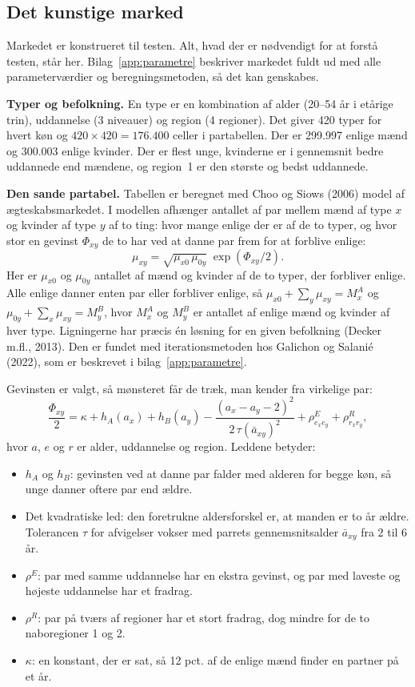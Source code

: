 \documentclass[11pt,a4paper]{article}
\begin{document}
\subsection{Det kunstige marked}

Markedet er konstrueret til testen. Alt, hvad der er nødvendigt for at forstå testen, står her.
Bilag~\ref{app:parametre} beskriver markedet fuldt ud med alle parameterværdier og
beregningsmetoden, så det kan genskabes.

\textbf{Typer og befolkning.} En type er en kombination af alder (20--54 år i etårige trin),
uddannelse (3 niveauer) og region (4 regioner). Det giver 420 typer for hvert køn og
$420\times420=176.400$ celler i partabellen. Der er 299.997 enlige mænd og 300.003 enlige kvinder.
Der er flest unge, kvinderne er i gennemsnit bedre uddannede end mændene, og region~1 er den største
og bedst uddannede.

\textbf{Den sande partabel.} Tabellen er beregnet med Choo og Siows (2006) model af
ægteskabsmarkedet. I modellen afhænger antallet af par mellem mænd af type $x$ og kvinder af type $y$
af to ting: hvor mange enlige der er af de to typer, og hvor stor en gevinst $\Phi_{xy}$ de to har
ved at danne par frem for at forblive enlige:
\[
\mu_{xy}=\sqrt{\mu_{x0}\,\mu_{0y}}\;\exp(\Phi_{xy}/2) .
\]
Her er $\mu_{x0}$ og $\mu_{0y}$ antallet af mænd og kvinder af de to typer, der forbliver enlige.
Alle enlige danner enten par eller forbliver enlige, så
$\mu_{x0}+\sum_y\mu_{xy}=M^A_x$ og $\mu_{0y}+\sum_x\mu_{xy}=M^B_y$, hvor $M^A_x$ og $M^B_y$ er antallet
af enlige mænd og kvinder af hver type. Ligningerne har præcis én løsning for en given befolkning
(Decker m.fl., 2013). Den er fundet med iterationsmetoden hos Galichon og Salanié (2022), som er
beskrevet i bilag~\ref{app:parametre}.

Gevinsten er valgt, så mønsteret får de træk, man kender fra virkelige par:
\[
\frac{\Phi_{xy}}{2}=\kappa+h_A(a_x)+h_B(a_y)-\frac{(a_x-a_y-2)^2}{2\,\tau(\bar a_{xy})^2}
+\rho^E_{e_xe_y}+\rho^R_{r_xr_y},
\]
hvor $a$, $e$ og $r$ er alder, uddannelse og region. Leddene betyder:

\begin{itemize}
\item $h_A$ og $h_B$: gevinsten ved at danne par falder med alderen for begge køn, så unge danner
oftere par end ældre.
\item Det kvadratiske led: den foretrukne aldersforskel er, at manden er to år ældre. Tolerancen
$\tau$ for afvigelser vokser med parrets gennemsnitsalder $\bar a_{xy}$ fra 2 til 6 år.
\item $\rho^E$: par med samme uddannelse har en ekstra gevinst, og par med laveste og højeste
uddannelse har et fradrag.
\item $\rho^R$: par på tværs af regioner har et stort fradrag, dog mindre for de to naboregioner 1
og 2.
\item $\kappa$: en konstant, der er sat, så 12 pct. af de enlige mænd finder en partner på et år.
\end{itemize}
\end{document}
